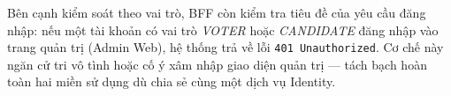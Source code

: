 Bên cạnh kiểm soát theo vai trò, BFF còn kiểm tra tiêu đề  của yêu cầu đăng nhập: nếu một tài khoản có vai trò \textit{VOTER} hoặc \textit{CANDIDATE} đăng nhập vào trang quản trị (Admin Web), hệ thống trả về lỗi \texttt{401 Unauthorized}. Cơ chế này ngăn cử tri vô tình hoặc cố ý xâm nhập giao diện quản trị — tách bạch hoàn toàn hai miền sử dụng dù chia sẻ cùng một dịch vụ Identity.
